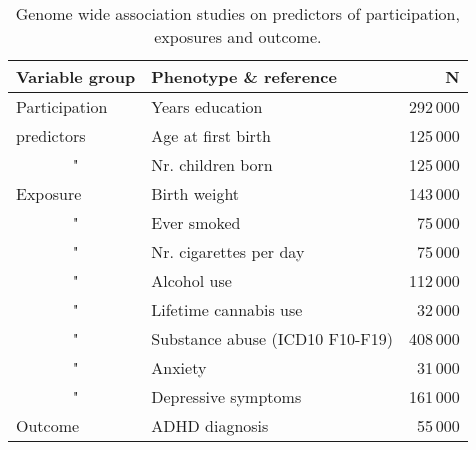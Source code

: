 
\begin{table}[ht]
	\begin{center}
		\begin{tabular}{llr}
			\hline
			Variable group        & Phenotype \& reference           & N \\
			\hline
			Participation         & Years education\cite{Okbay2016-mg} 	   & 292\,000\\
			predictors             & Age at first birth\cite{Barban2016-fa}       & 125\,000\\
			\multicolumn{1}{c}{"} & Nr. children born\cite{Barban2016-fa}       & 125\,000\\
			Exposure              & Birth weight\cite{Horikoshi2016-gz}    & 143\,000\\
			\multicolumn{1}{c}{"} & Ever smoked\cite{Tob_Gen_Cons2010-se} & 75\,000\\
			\multicolumn{1}{c}{"} & Nr. cigarettes per day\cite{Tob_Gen_Cons2010-se} & 75\,000\\
			\multicolumn{1}{c}{"} & Alcohol use\cite{Clarke2017-xz}       & 112\,000\\
			\multicolumn{1}{c}{"} & Lifetime cannabis use\cite{Stringer2016-or}     & 32\,000\\
			\multicolumn{1}{c}{"} & Substance abuse (ICD10 F10-F19)\cite{Canela-Xandri2017-xr}   & 408\,000\\
			\multicolumn{1}{c}{"} & Anxiety\cite{Otowa2016-uo}        & 31\,000\\
			\multicolumn{1}{c}{"} & Depressive symptoms\cite{Okbay2016-pj}        & 161\,000\\
			Outcome               & ADHD diagnosis\cite{Demontis2017-zu}     & 55\,000\\
			\hline
		\end{tabular}
	\end{center}
	\caption{Genome wide association studies on predictors of participation, exposures and outcome.}
	\label{tab:gwas}
\end{table}
